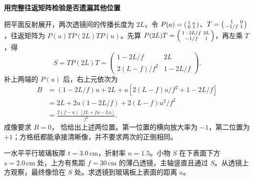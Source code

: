 \begin{solution}
\par\medskip{}\noindent\textbf{用完整往返矩阵检验是否遗漏其他位置}\par\nobreak
把平面反射展开，两次透镜间的传播长度为 \(2L\)，令 \(P(a)=\begin{psmallmatrix}1&a\\0&1\end{psmallmatrix}\)、\(T=\begin{psmallmatrix}1&0\\-1/f&1\end{psmallmatrix}\)，往返矩阵为 \(P(u)TP(2L)TP(u)\)。先算 $P(2L)T=\begin{psmallmatrix}1-2L/f&2L\\-1/f&1\end{psmallmatrix}$，再左乘 $T$，得
\[
 S=TP(2L)T=
 \begin{pmatrix}1-2L/f&2L\\2(L-f)/f^2&1-2L/f\end{pmatrix}.
\]
补上两端的 $P(u)$ 后，右上元依次为
\begin{align*}
 B&=(1-2L/f)u+2L+u[2(L-f)u/f^2+1-2L/f]\\
 &=2L+2u(1-2L/f)+2(L-f)u^2/f^2\\
 &=\frac{2(f-u)\,[fL+fu-Lu]}{f^2}.
\end{align*}
成像要求 $B=0$，
恰给出上述两位置。第一位置的横向放大率为 \(-1\)，第二位置为 \(+1\)；方格纸都能承接清晰像，并不要求两次的正倒相同。
\end{solution}

\begin{question}
\begin{example}[玻璃板上方透镜使像回到物点]\label{ex:o45}
一水平平行玻璃板厚 \(t=3.0\,\mathrm{cm}\)，折射率 \(n=1.5\)。小物 \(S\) 在下表面下方 \(s=2.0\,\mathrm{cm}\) 处，上方有焦距 \(f=30\,\mathrm{cm}\) 的薄凸透镜，主轴竖直且通过 \(S\)。从透镜上方观察，最终像恰在 \(S\) 处。求透镜到玻璃板上表面的距离 \(a\)。
\end{example}
\end{question}

